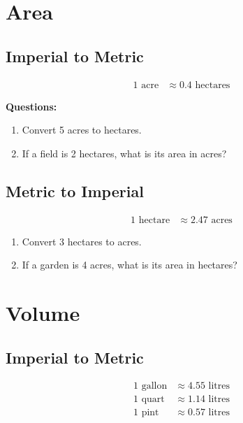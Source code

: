 \documentclass{article}
\begin{document}
\section*{Area}

\subsection*{Imperial to Metric}

\begin{align*}
1 \text{ acre} &\approx 0.4 \text{ hectares}
\end{align*}

\textbf{Questions:}
\begin{enumerate}
    \item Convert 5 acres to hectares.
    \item If a field is 2 hectares, what is its area in acres?
\end{enumerate}

\subsection*{Metric to Imperial}

\begin{align*}
1 \text{ hectare} &\approx 2.47 \text{ acres}
\end{align*}

\begin{enumerate}
    \item Convert 3 hectares to acres.
    \item If a garden is 4 acres, what is its area in hectares?
\end{enumerate}

\section*{Volume}

\subsection*{Imperial to Metric}

\begin{align*}
1 \text{ gallon} &\approx 4.55 \text{ litres} \\
1 \text{ quart} &\approx 1.14 \text{ litres} \\
1 \text{ pint} &\approx 0.57 \text{ litres} \\
\end{align*}
\end{document}
